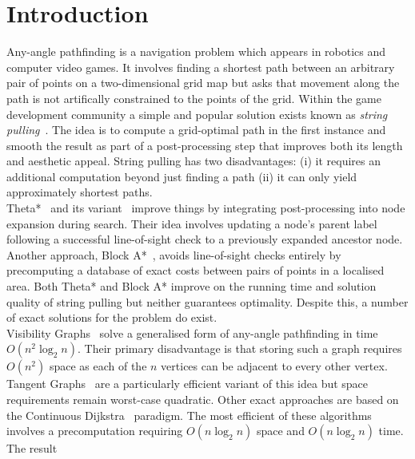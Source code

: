 \section{Introduction}
Any-angle pathfinding is a navigation problem which appears in robotics
and computer video games. It involves finding a shortest path between an 
arbitrary pair of points on a two-dimensional grid map but asks that 
movement along the path is not artifically constrained to the points of 
the grid.  Within the game development community a simple and popular 
solution exists known as \emph{string pulling}~\citep{pinter01,botea04}.
The idea is to compute a grid-optimal path in the first
instance and smooth the result as part of a post-processing step that improves
both its length and aesthetic appeal. String pulling has two disadvantages: 
(i) it requires an additional computation beyond just finding a path (ii)
it can only yield approximately shortest paths.
\\
Theta*~\citep{nash07} and its variant~\citep{%
nash10} improve things 
by integrating post-processing into node expansion during search. Their 
idea involves updating a node's parent label following a successful line-of-sight
check to a previously expanded ancestor node.
Another approach, Block A*~\citep{yap11}, avoids line-of-sight checks entirely 
by precomputing a database of exact costs between pairs of points in a localised area.
Both Theta* and Block A* improve on the running time and 
solution quality of string pulling but neither guarantees optimality.
Despite this, a number of exact solutions for the problem do exist.
\\
Visibility Graphs~\citep{lozanoperez79} solve a generalised form of 
any-angle pathfinding in time $O(n^2\log_{2}n)$. Their primary disadvantage
is that storing such a graph requires $O(n^2)$ space as each of the $n$ 
vertices can be adjacent to every other vertex.  
Tangent Graphs~\citep{liu92} are a particularly efficient 
variant of this idea but space requirements remain worst-case quadratic. 
Other exact approaches are based on the 
Continuous Dijkstra~\citep{mitchell87} paradigm.
The most efficient of these algorithms~\citep{hershberger99} involves a
precomputation requiring $O(n \log_{2}{n})$ space and $O(n\log_{2}n)$ time.  The result 
